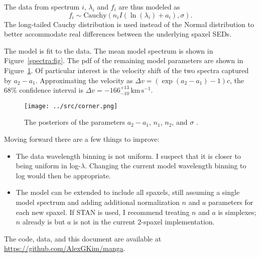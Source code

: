 \documentclass[11pt, oneside]{article}   	%
\begin{document}
The data from spectrum $i$, $\lambda_i$ and $f_i$ are thus modeled as
\begin{equation}
f_i \sim \text{Cauchy}\left(n_i I(\ln(\lambda_i) + a_i), \sigma\right).
\end{equation}
The long-tailed Cauchy distribution is used instead of the Normal distribution to better accommodate real differences between the underlying spaxel SEDs.

The model is fit to the data.
The mean model spectrum is shown in Figure~\ref{spectra:fig}.
The pdf of the remaining model parameters are shown in Figure~\ref{corner:fig}.
Of particular interest is the velocity shift of the two spectra captured
by $a_2-a_1$.  Approximating the velocity as $\Delta v = (\exp{\left(a_2-a_1\right) }- 1)c$, the
  68\% confidence interval is $\Delta v =   -166_{-      10}^{+      13}\, \text{km}\,\text{s}^{-1} $. 


\begin{figure}[htbp] %
   \centering
   \texttt{[image: ../src/corner.png]} 
   \caption{The posteriors of the parameters $a_2-a_1$, $n_1$, $n_2$, and $\sigma$ .
   \label{corner:fig}}
\end{figure}

Moving forward there are a few things to improve:
\begin{itemize}
\item The data wavelength binning is not uniform.  I suspect that it is closer to being uniform in log-$\lambda$.  Changing the current model wavelength binning to
log would then be appropriate.
\item The model can be extended to include all spaxels, still assuming a single model spectrum and adding additional normalization $n$ and $a$ parameters
for each new spaxel.  If STAN is used, I recommend treating $n$ and $a$ is simplexes; $n$ already is but $a$ is not in the current 2-spaxel implementation.
\end{itemize}

The code, data, and this document are available at \url{https://github.com/AlexGKim/manga}.
\end{document}

